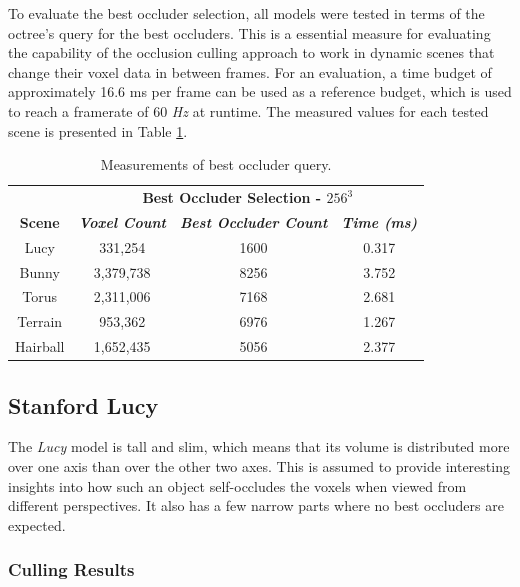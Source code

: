 To evaluate the best occluder selection, all models were tested in terms of the octree's 
query for the best occluders. This is a essential measure for evaluating the capability 
of the occlusion culling approach to work in dynamic scenes that change their voxel 
data in between frames. For an evaluation, a time budget of approximately 16.6 ms per 
frame can be used as a reference budget, which is used to reach a framerate of 60 \emph{Hz} 
at runtime. The measured values for each tested scene is presented in Table \ref{tab:best-occluder-query}. 

\begin{table}[htbp]
  \begin{center}
    \begin{tabular}{|c|c|c|c|}
      \hline
      \textbf{}&\multicolumn{3}{|c|}{\textbf{Best Occluder Selection - $256^3$}} \\
      \cline{2-4} 
      \textbf{Scene} & \textbf{\textit{Voxel Count}}& \textbf{\textit{Best Occluder Count}}& \textbf{\textit{Time (ms)}} \\
      \hline
      Lucy        & 331,254   & 1600 & 0.317 \\
      Bunny       & 3,379,738 & 8256 & 3.752 \\
      Torus       & 2,311,006 & 7168 & 2.681 \\
      Terrain     & 953,362   & 6976 & 1.267 \\
      Hairball    & 1,652,435 & 5056 & 2.377 \\
      \hline
    \end{tabular}
    \caption{Measurements of best occluder query.}
  \label{tab:best-occluder-query}
  \end{center}
\end{table}


\subsection*{Stanford Lucy}

The \emph{Lucy} model is tall and slim, which means that its volume is distributed more over one axis 
than over the other two axes. This is assumed to provide interesting insights into how such an object 
self-occludes the voxels when viewed from different perspectives. It also has a few narrow parts where 
no best occluders are expected.

\subsubsection*{Culling Results} \label{subsubsec-culling-results-lucy}

